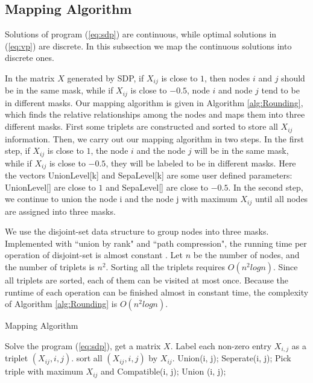 \documentclass[10pt,conference]{IEEEtran}
\begin{document}
\subsection{Mapping Algorithm}

Solutions of program (\ref{eq:sdp}) are continuous, while optimal solutions in (\ref{eq:vp}) are discrete.
In this subsection we map the continuous solutions into discrete ones.

In the matrix $X$ generated by SDP, if $X_{ij}$ is close to $1$, then nodes $i$ and $j$ should be in the same mask, while if $X_{ij}$ is close to $-0.5$, node $i$ and node $j$ tend to be in different masks.
Our mapping algorithm is given in Algorithm \ref{alg:Rounding}, which finds the relative relationships among the nodes and maps them into three different masks.
First some triplets are constructed and sorted to store all $X_{ij}$ information.
Then, we carry out our mapping algorithm in two steps.
In the first step, if $X_{ij}$ is close to $1$, the node $i$ and the node $j$ will be in the same mask, while if $X_{ij}$ is close to $-0.5$, they will be labeled to be in different masks.
Here the vectors UnionLevel[k] and SepaLevel[k] are some user defined parameters: UnionLevel[] are close to $1$ and SepaLevel[] are close to $-0.5$.
In the second step, we continue to union the node i and the node j with maximum $X_{ij}$ until all nodes are assigned into three masks.

We use the disjoint-set data structure to group nodes into three masks. Implemented with ``union by rank" and ``path compression", the running time per operation of disjoint-set is almost constant \cite{book90Algorithm}. 
Let $n$ be the number of nodes, and the number of triplets is $n^2$.
Sorting all the triplets requires $O(n^2logn)$. 
Since all triplets are sorted, each of them can be visited at most once.
Because the runtime of each operation can be finished almost in constant time, the complexity of Algorithm \ref{alg:Rounding} is $O(n^2logn)$.

\begin{algorithm}[htb]
\caption{Mapping Algorithm} 
\label{alg:Rounding}
\begin{algorithmic}[1]
\STATE Solve the program (\ref{eq:sdp}), get a matrix $X$.
	\STATE Label each non-zero entry $X_{i, j}$ as a triplet $(X_{ij}, i, j)$.
	\STATE sort all $(X_{ij}, i, j)$ by $X_{ij}$.
				\STATE Union(i, j);
			\ENDIF
		\ENDFOR
				\STATE Seperate(i, j);
			\ENDIF
		\ENDFOR
	\ENDFOR
		\STATE Pick triple with maximum $X_{ij}$ and Compatible(i, j);
		\STATE Union (i, j);
	\ENDWHILE
\end{algorithmic}
\end{algorithm}
\end{document}
